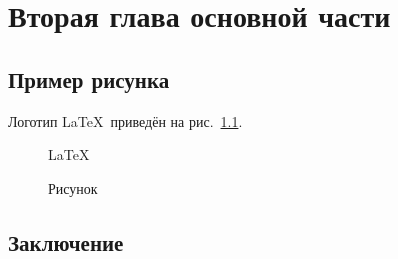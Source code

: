 \chapter{Вторая глава основной части} \label{chap:2}

\section{Пример рисунка}

Логотип \LaTeX~приведён на рис.~\ref{fig:latex}.

\begin{figure}[ht]
\centering
  \Huge\LaTeX
  \caption{Рисунок}
  \label{fig:latex}
\end{figure}

\section{Заключение}
